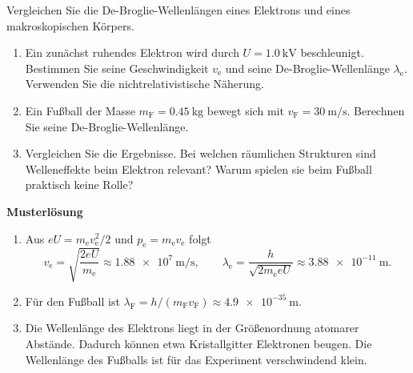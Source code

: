 \begin{ExerciseBlock}
Vergleichen Sie die De-Broglie-Wellenlängen eines Elektrons und eines makroskopischen Körpers.
\begin{enumerate}
\item Ein zunächst ruhendes Elektron wird durch $U=\qty{1.0}{\kilo\volt}$ beschleunigt. Bestimmen Sie seine Geschwindigkeit $v_\mathrm e$ und seine De-Broglie-Wellenlänge $\lambda_\mathrm e$. Verwenden Sie die nichtrelativistische Näherung.
\item Ein Fußball der Masse $m_\mathrm F=\qty{0.45}{\kilogram}$ bewegt sich mit $v_\mathrm F=\qty{30}{\metre\per\second}$. Berechnen Sie seine De-Broglie-Wellenlänge.
\item Vergleichen Sie die Ergebnisse. Bei welchen räumlichen Strukturen sind Welleneffekte beim Elektron relevant? Warum spielen sie beim Fußball praktisch keine Rolle?
\end{enumerate}
\end{ExerciseBlock}
\begin{Solution}
\par\medskip\noindent\textbf{Musterlösung}\par\nopagebreak[4]
\begin{enumerate}
\item Aus $eU=m_\mathrm e v_\mathrm e^2/2$ und $p_\mathrm e=m_\mathrm e v_\mathrm e$ folgt
\[
 v_\mathrm e=\sqrt{\frac{2eU}{m_\mathrm e}}\approx\qty{1.88e7}{\metre\per\second},
 \qquad
 \lambda_\mathrm e=\frac{h}{\sqrt{2m_\mathrm e eU}}\approx\qty{3.88e-11}{\metre}.
\]
\item Für den Fußball ist $\lambda_\mathrm F=h/(m_\mathrm Fv_\mathrm F)\approx\qty{4.9e-35}{\metre}$.
\item Die Wellenlänge des Elektrons liegt in der Größenordnung atomarer Abstände. Dadurch können etwa Kristallgitter Elektronen beugen. Die Wellenlänge des Fußballs ist für das Experiment verschwindend klein.
\end{enumerate}
\end{Solution}
